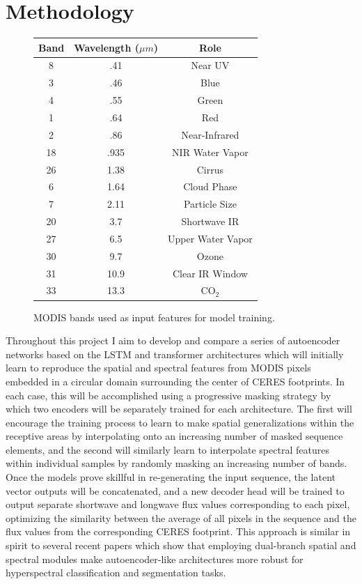 \documentclass[12pt]{article}
\begin{document}
\vspace{-1em}
\section{Methodology}
\vspace{-1em}

\begin{figure}
    \centering
    \begin{tabular}{| c c c |}
        Band & Wavelength ($\mu m$) & Role \\
        \hline
        8 & .41 & Near UV \\
        3 & .46 & Blue \\
        4 & .55 & Green \\
        1 & .64 & Red \\
        2 & .86 & Near-Infrared \\
        18 & .935 & NIR Water Vapor \\
        26 & 1.38 & Cirrus \\
        6 & 1.64 & Cloud Phase \\
        7 & 2.11 & Particle Size \\
        20 & 3.7 & Shortwave IR \\
        27 & 6.5 & Upper Water Vapor\\
        30 & 9.7 & Ozone \\
        31 & 10.9 & Clear IR Window \\
        33 & 13.3 & CO$_2$ \\
    \end{tabular}
    \caption{MODIS bands used as input features for model training.}
\end{figure}

Throughout this project I aim to develop and compare a series of autoencoder networks based on the LSTM and transformer architectures which will initially learn to reproduce the spatial and spectral features from MODIS pixels embedded in a circular domain surrounding the center of CERES footprints. In each case, this will be accomplished using a progressive masking strategy by which two encoders will be separately trained for each architecture. The first will encourage the training process to learn to make spatial generalizations within the receptive areas by interpolating onto an increasing number of masked sequence elements, and the second will similarly learn to interpolate spectral features within individual samples by randomly masking an increasing number of bands. Once the models prove skillful in re-generating the input sequence, the latent vector outputs will be concatenated, and a new decoder head will be trained to output separate shortwave and longwave flux values corresponding to each pixel, optimizing the similarity between the average of all pixels in the sequence and the flux values from the corresponding CERES footprint. This approach is similar in spirit to several recent papers  which show that employing dual-branch spatial and spectral modules make autoencoder-like architectures more robust for hyperspectral classification and segmentation tasks. \cite{praveen_novel_2019}\cite{praveen_bidirectional_2022}\cite{praveen_dual-branch-attentionnet_2022}
\end{document}

